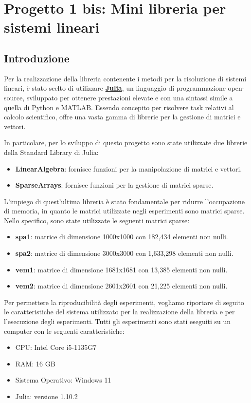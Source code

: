 \chapter{Progetto 1 bis: Mini libreria per sistemi lineari}
\section{Introduzione}\label{sec:intro}
Per la realizzazione della libreria contenente i metodi per la risoluzione di
sistemi lineari, è stato scelto di utilizzare \href{https://julialang.org/}{\textbf{Julia}},
un linguaggio di programmazione open-source, sviluppato per ottenere prestazioni
elevate e con una sintassi simile a quella di Python e MATLAB. Essendo concepito
per risolvere task relativi al calcolo scientifico, offre una vasta gamma di
librerie per la gestione di matrici e vettori.

In particolare, per lo sviluppo di questo progetto sono state utilizzate due
librerie della Standard Library di Julia:
\begin{itemize}
    \item \textbf{LinearAlgebra}: fornisce funzioni per la manipolazione di
          matrici e vettori.
    \item \textbf{SparseArrays}: fornisce funzioni per la gestione di matrici sparse.
\end{itemize}

L'impiego di quest'ultima libreria è stato fondamentale per ridurre l'occupazione
di memoria, in quanto le matrici utilizzate negli esperimenti sono matrici sparse.
Nello specifico, sono state utilizzate le seguenti matrici sparse:
\begin{itemize}
    \item \textbf{spa1}: matrice di dimensione 1000x1000 con 182,434 elementi non nulli.
    \item \textbf{spa2}: matrice di dimensione 3000x3000 con 1,633,298 elementi non nulli.
    \item \textbf{vem1}: matrice di dimensione 1681x1681 con 13,385 elementi non nulli.
    \item \textbf{vem2}: matrice di dimensione 2601x2601 con 21,225 elementi non nulli.
\end{itemize}

Per permettere la riproducibilità degli esperimenti, vogliamo riportare di seguito
le caratteristiche del sistema utilizzato per la realizzazione della libreria e
per l'esecuzione degli esperimenti. Tutti gli esperimenti sono stati eseguiti su
un computer con le seguenti caratteristiche:
\begin{itemize}
    \item CPU: Intel Core i5-1135G7
    \item RAM: 16 GB
    \item Sistema Operativo: Windows 11
    \item Julia: versione 1.10.2
\end{itemize}

